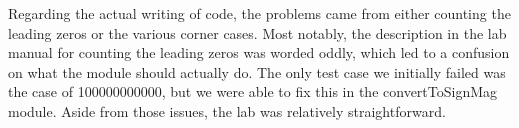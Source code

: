 \documentclass{article}
\begin{document}
Regarding the actual writing of code, the problems came from either counting the leading zeros or the various corner cases.  Most notably, the description in the lab manual for counting the leading zeros was worded oddly, which led to a confusion on what the module should actually do.  The only test case we initially failed was the case of 100000000000, but we were able to fix this in the convertToSignMag module. Aside from those issues, the lab was relatively straightforward.  




%

%

\end{document}
